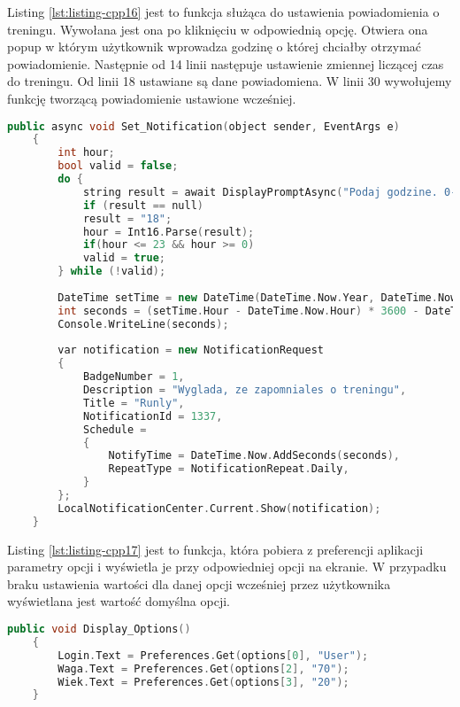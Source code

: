 Listing \ref{lst:listing-cpp16} jest to funkcja służąca do ustawienia powiadomienia o treningu. Wywołana jest ona po kliknięciu w odpowiednią opcję. Otwiera ona popup w którym użytkownik wprowadza godzinę o której chciałby otrzymać powiadomienie. Następnie od 14 linii następuje ustawienie zmiennej liczącej czas do treningu. Od linii 18 ustawiane są dane powiadomiena. W linii 30 wywołujemy funkcję tworzącą powiadomienie ustawione wcześniej. 
\begin{lstlisting}[caption=Ustawienie powiadomienia o treningu, label={lst:listing-cpp16}, language=C++]
	public async void Set_Notification(object sender, EventArgs e)
	{
		int hour;
		bool valid = false;
		do {
			string result = await DisplayPromptAsync("Podaj godzine. 0-23", "");
			if (result == null)
			result = "18";
			hour = Int16.Parse(result);
			if(hour <= 23 && hour >= 0)
			valid = true;
		} while (!valid);
			
		DateTime setTime = new DateTime(DateTime.Now.Year, DateTime.Now.Month, DateTime.Now.Day, hour, 0, 0);
		int seconds = (setTime.Hour - DateTime.Now.Hour) * 3600 - DateTime.Now.Minute * 60 + DateTime.Now.Second;
		Console.WriteLine(seconds);
		
		var notification = new NotificationRequest
		{
			BadgeNumber = 1,
			Description = "Wyglada, ze zapomniales o treningu",
			Title = "Runly",
			NotificationId = 1337,
			Schedule =
			{
				NotifyTime = DateTime.Now.AddSeconds(seconds),
				RepeatType = NotificationRepeat.Daily,            
			}
		};
		LocalNotificationCenter.Current.Show(notification);
	}
\end{lstlisting}

Listing \ref{lst:listing-cpp17} jest to funkcja, która pobiera z preferencji aplikacji parametry opcji i wyświetla je przy odpowiedniej opcji na ekranie. W przypadku braku ustawienia wartości dla danej opcji wcześniej przez użytkownika wyświetlana jest wartość domyślna opcji. 
\begin{lstlisting}[caption=Wyświetlenie ustawionych opcji w widoku, label={lst:listing-cpp17}, language=C++]
	public void Display_Options()
	{
		Login.Text = Preferences.Get(options[0], "User");
		Waga.Text = Preferences.Get(options[2], "70");
		Wiek.Text = Preferences.Get(options[3], "20");
	}
\end{lstlisting}